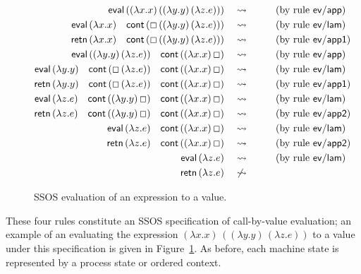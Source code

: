 \begin{figure}
\begin{align*}
{\sf eval}\,((\lambda x.x)\,((\lambda y.y)\,(\lambda z.e))) 
& ~~~\rightsquigarrow~~ \tag{by rule ${\sf ev/app}$}\\
{\sf eval}\,(\lambda x.x) \quad
{\sf cont}\,(\Box\,((\lambda y.y)\,(\lambda z.e)))
& ~~~\rightsquigarrow~~ \tag{by rule ${\sf ev/lam}$}\\
{\sf retn}\,(\lambda x.x) \quad
{\sf cont}\,(\Box\,((\lambda y.y)\,(\lambda z.e)))
& ~~~\rightsquigarrow~~ \tag{by rule ${\sf ev/app1}$}\\
{\sf eval}\,((\lambda y.y)\,(\lambda z.e)) \quad
{\sf cont}\,((\lambda x.x)\,\Box)
& ~~~\rightsquigarrow~~ \tag{by rule ${\sf ev/app}$}\\
{\sf eval}\,(\lambda y.y) \quad
{\sf cont}\,(\Box\,(\lambda z.e)) \quad
{\sf cont}\,((\lambda x.x)\,\Box)
& ~~~\rightsquigarrow~~ \tag{by rule ${\sf ev/lam}$}\\
{\sf retn}\,(\lambda y.y) \quad
{\sf cont}\,(\Box\,(\lambda z.e)) \quad
{\sf cont}\,((\lambda x.x)\,\Box)
& ~~~\rightsquigarrow~~ \tag{by rule ${\sf ev/app1}$}\\
{\sf eval}\,(\lambda z.e) \quad
{\sf cont}\,((\lambda y.y)\,\Box) \quad
{\sf cont}\,((\lambda x.x)\,\Box)
& ~~~\rightsquigarrow~~ \tag{by rule ${\sf ev/lam}$}\\
{\sf retn}\,(\lambda z.e) \quad
{\sf cont}\,((\lambda y.y)\,\Box) \quad
{\sf cont}\,((\lambda x.x)\,\Box)
& ~~~\rightsquigarrow~~ \tag{by rule ${\sf ev/app2}$}\\
{\sf eval}\,(\lambda z.e) \quad
{\sf cont}\,((\lambda x.x)\,\Box)
& ~~~\rightsquigarrow~~ \tag{by rule ${\sf ev/lam}$}\\
{\sf retn}\,(\lambda z.e) \quad
{\sf cont}\,((\lambda x.x)\,\Box)
& ~~~\rightsquigarrow~~ \tag{by rule ${\sf ev/app2}$}\\
{\sf eval}\,(\lambda z.e) 
& ~~~\rightsquigarrow~~ \tag{by rule ${\sf ev/lam}$}\\
{\sf retn}\,(\lambda z.e) 
& ~~~\not\rightsquigarrow~~ 
\end{align*}
\caption{SSOS evaluation of an expression to a value.}
\label{fig:ssos-example}
\end{figure}

These four rules constitute an SSOS specification of call-by-value
evaluation; an example of an evaluating the expression $(\lambda
x.x)\,((\lambda y.y)\,(\lambda z.e))$ to a value under this
specification is given in Figure~\ref{fig:ssos-example}.  As before,
each machine state is represented by a process state or ordered
context.

